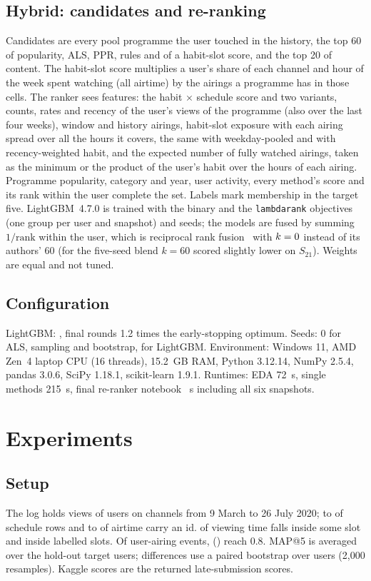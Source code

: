 \documentclass[conference]{IEEEtran}
\begin{document}
\subsection{Hybrid: candidates and re-ranking}
Candidates are every pool programme the user touched in the history, the top 60 of popularity, ALS, PPR, rules and of a habit-slot score, and the top 20 of content. The habit-slot score multiplies a user's share of each channel and hour of the week spent watching (all airtime) by the airings a programme has in those cells. The ranker sees \nFeatures{} features: the habit $\times$ schedule score and two variants, counts, rates and recency of the user's views of the programme (also over the last four weeks), window and history airings, habit-slot exposure with each airing spread over all the hours it covers, the same with weekday-pooled and with recency-weighted habit, and the expected number of fully watched airings, taken as the minimum or the product of the user's habit over the hours of each airing. Programme popularity, category and year, user activity, every method's score and its rank within the user complete the set. Labels mark membership in the target five. LightGBM~4.7.0 is trained with the binary and the \texttt{lambdarank} objectives (one group per user and snapshot) and \nSeeds{} seeds; the \nModels{} models are fused by summing $1/\mathrm{rank}$ within the user, which is reciprocal rank fusion~\cite{cormack2009} with $k=0$ instead of its authors' $60$ (for the five-seed blend $k=60$ scored slightly lower on $S_{21}$). Weights are equal and not tuned.

\subsection{Configuration}
LightGBM: \lgbParams, final rounds 1.2 times the early-stopping optimum. Seeds: 0 for ALS, sampling and bootstrap, \seedRange{} for LightGBM. Environment: Windows 11, AMD Zen~4 laptop CPU (16 threads), 15.2~GB RAM, Python 3.12.14, NumPy 2.5.4, pandas 3.0.6, SciPy 1.18.1, scikit-learn 1.9.1. Runtimes: EDA 72~s, single methods 215~s, final re-ranker notebook \finalRuntime~s including all six snapshots.

\section{Experiments}
\subsection{Setup}
The log holds \nViews{} views of \nUsers{} users on \nLogChannels{} channels from 9 March to 26 July 2020; \labRowsLo{} to \labRowsHi{} of schedule rows and \labAirLo{} to \labAirHi{} of airtime carry an id. \inSlots{} of viewing time falls inside some slot and \inLabSlots{} inside labelled slots. Of \nEvents{} user-airing events, \nEventsQ{} (\shareEventsQ) reach 0.8. MAP@5 is averaged over the hold-out target users; differences use a paired bootstrap over users (2,000 resamples). Kaggle scores are the returned late-submission scores.
\end{document}
